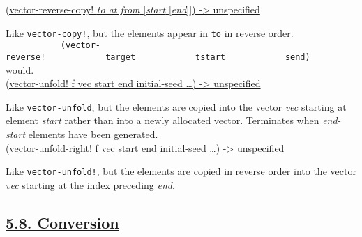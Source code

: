 \href{}{(vector-reverse-copy! \emph{to at from} {[}\emph{start}
{[}\emph{end}{]}{]}) -\textgreater{} unspecified}

Like \texttt{vector-copy!}, but the elements appear in \texttt{to} in
reverse order.
\texttt{\ \ \ \ \ \ \ \ \ \ \ (vector-reverse!\ \ \ \ \ \ \ \ \ \ \ \ target\ \ \ \ \ \ \ \ \ \ \ \ tstart\ \ \ \ \ \ \ \ \ \ \ \ send)\ \ \ \ \ \ \ \ \ }
would.\\[2\baselineskip]

\href{}{(vector-unfold! f vec start end initial-seed \ldots{})
-\textgreater{} unspecified}

Like \texttt{vector-unfold}, but the elements are copied into the vector
\emph{vec} starting at element \emph{start} rather than into a newly
allocated vector. Terminates when \emph{end-start} elements have been
generated.\\[2\baselineskip]

\href{}{(vector-unfold-right! f vec start end initial-seed \ldots{})
-\textgreater{} unspecified}

Like \texttt{vector-unfold!}, but the elements are copied in reverse
order into the vector \emph{vec} starting at the index preceding
\emph{end}.\\[2\baselineskip]

\subsection{\texorpdfstring{\href{}{5.8.
Conversion}}{5.8. Conversion}}\label{conversion}

